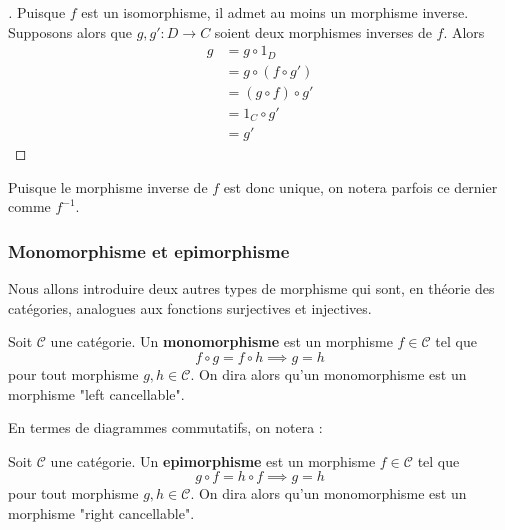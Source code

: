 \documentclass{article}
\begin{document}
\begin{proof}[]{}
Puisque $f$ est un isomorphisme, il admet au moins un morphisme inverse. Supposons alors que $g, g':D\to C$ soient deux morphismes inverses de $f$. Alors
\begin{equation*}
\begin{aligned}
    g &= g\circ 1_D\\
      &= g\circ(f\circ g')\\
      &= (g\circ f)\circ g'\\
      &= 1_C\circ g'\\
      &= g'
\end{aligned}
\end{equation*}
\end{proof}

Puisque le morphisme inverse de $f$ est donc unique, on notera parfois ce dernier comme $f^{-1}$.

\subsubsection{Monomorphisme et epimorphisme}
Nous allons introduire deux autres types de morphisme qui sont, en théorie des catégories, analogues aux fonctions surjectives et injectives.

\begin{definition}[Monomorphisme]{}
    Soit $\mathcal C$ une catégorie. Un \textbf{monomorphisme} est un morphisme $f\in\mathcal C$ tel que
    $$
    f\circ g=f\circ h\implies g=h
    $$
    pour tout morphisme $g,h\in\mathcal C$. On dira alors qu'un monomorphisme est un morphisme "left cancellable".
\end{definition}

\noindent
En termes de diagrammes commutatifs, on notera :

\begin{center}
\end{center}

\begin{definition}[Epimorphisme]{}
    Soit $\mathcal C$ une catégorie. Un \textbf{epimorphisme} est un morphisme $f\in\mathcal C$ tel que
    $$
    g\circ f=h\circ f\implies g = h
    $$
    pour tout morphisme $g,h\in\mathcal C$. On dira alors qu'un monomorphisme est un morphisme "right cancellable".
\end{definition}
\end{document}
